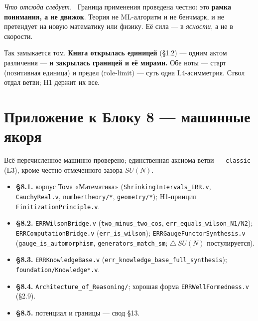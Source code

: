\documentclass[12pt,a4paper]{article}
\newcommand{\rezultat}{\medskip\noindent\emph{Что отсюда следует.}\ }
\begin{document}
\rezultat
Граница применения проведена честно: это \textbf{рамка понимания, а не движок}. Теория не
ML-алгоритм и не бенчмарк, и не претендует на новую математику или физику. Её сила --- в
\emph{ясности}, а не в скорости.

\medskip
\noindent Так замыкается том. \textbf{Книга открылась единицей} (§1.2) --- одним актом различения ---
\textbf{и закрылась границей и её мирами.} Обе ноты --- старт (позитивная единица) и предел
(role-limit) --- суть одна L4-асимметрия. Ствол отдал ветви; H1 держит их все.

\appendix
\section*{Приложение к Блоку 8 — машинные якоря}
\small\raggedright\sloppy
\noindent Всё перечисленное машинно проверено; единственная аксиома ветви --- \texttt{classic} (L3),
кроме честно отмеченного зазора $SU(N)$.

\begin{itemize}\itemsep2pt
\item \textbf{§8.1.} корпус Тома «Математика» (\texttt{ShrinkingIntervals\_ERR.v},
\texttt{CauchyReal.v}, \texttt{numbertheory/*}, \texttt{geometry/*}); H1-принцип
\texttt{FinitizationPrinciple.v}.

\item \textbf{§8.2.} \texttt{ERRWilsonBridge.v} (\texttt{two\_minus\_two\_cos},
\texttt{err\_equals\_wilson\_N1/N2}); \texttt{ERRComputationBridge.v} (\texttt{err\_is\_wilson});
\texttt{ERRGaugeFunctorSynthesis.v} (\texttt{gauge\_is\_automorphism}, \texttt{generators\_match\_sm};
$\triangle\,SU(N)$ постулируется).

\item \textbf{§8.3.} \texttt{ERRKnowledgeBase.v} (\texttt{err\_knowledge\_base\_full\_synthesis});
\texttt{foundation/Knowledge*.v}.

\item \textbf{§8.4.} \texttt{Architecture\_of\_Reasoning/}; хорошая форма
\texttt{ERRWellFormedness.v} (§2.9).

\item \textbf{§8.5.} потенциал и границы --- свод §13.
\end{itemize}
\normalsize

\end{document}
